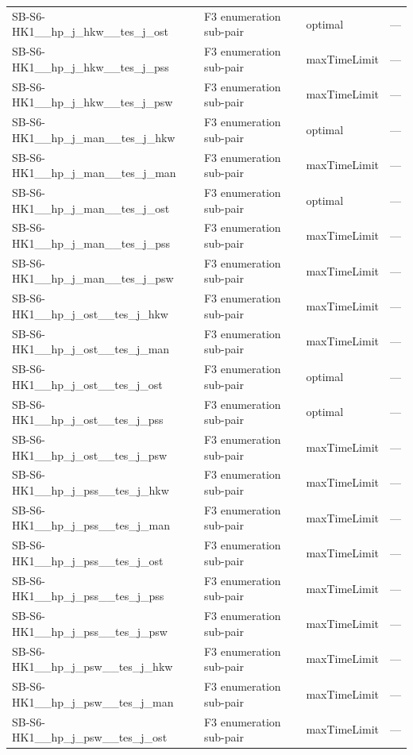 \begin{table}[htbp]
\begin{tabular}{lllr}
  SB-S6-HK1\_\_hp\_j\_hkw\_\_tes\_j\_ost & F3 enumeration sub-pair & optimal & — \\
  SB-S6-HK1\_\_hp\_j\_hkw\_\_tes\_j\_pss & F3 enumeration sub-pair & maxTimeLimit & — \\
  SB-S6-HK1\_\_hp\_j\_hkw\_\_tes\_j\_psw & F3 enumeration sub-pair & maxTimeLimit & — \\
  SB-S6-HK1\_\_hp\_j\_man\_\_tes\_j\_hkw & F3 enumeration sub-pair & optimal & — \\
  SB-S6-HK1\_\_hp\_j\_man\_\_tes\_j\_man & F3 enumeration sub-pair & maxTimeLimit & — \\
  SB-S6-HK1\_\_hp\_j\_man\_\_tes\_j\_ost & F3 enumeration sub-pair & optimal & — \\
  SB-S6-HK1\_\_hp\_j\_man\_\_tes\_j\_pss & F3 enumeration sub-pair & maxTimeLimit & — \\
  SB-S6-HK1\_\_hp\_j\_man\_\_tes\_j\_psw & F3 enumeration sub-pair & maxTimeLimit & — \\
  SB-S6-HK1\_\_hp\_j\_ost\_\_tes\_j\_hkw & F3 enumeration sub-pair & maxTimeLimit & — \\
  SB-S6-HK1\_\_hp\_j\_ost\_\_tes\_j\_man & F3 enumeration sub-pair & maxTimeLimit & — \\
  SB-S6-HK1\_\_hp\_j\_ost\_\_tes\_j\_ost & F3 enumeration sub-pair & optimal & — \\
  SB-S6-HK1\_\_hp\_j\_ost\_\_tes\_j\_pss & F3 enumeration sub-pair & optimal & — \\
  SB-S6-HK1\_\_hp\_j\_ost\_\_tes\_j\_psw & F3 enumeration sub-pair & maxTimeLimit & — \\
  SB-S6-HK1\_\_hp\_j\_pss\_\_tes\_j\_hkw & F3 enumeration sub-pair & maxTimeLimit & — \\
  SB-S6-HK1\_\_hp\_j\_pss\_\_tes\_j\_man & F3 enumeration sub-pair & maxTimeLimit & — \\
  SB-S6-HK1\_\_hp\_j\_pss\_\_tes\_j\_ost & F3 enumeration sub-pair & maxTimeLimit & — \\
  SB-S6-HK1\_\_hp\_j\_pss\_\_tes\_j\_pss & F3 enumeration sub-pair & maxTimeLimit & — \\
  SB-S6-HK1\_\_hp\_j\_pss\_\_tes\_j\_psw & F3 enumeration sub-pair & maxTimeLimit & — \\
  SB-S6-HK1\_\_hp\_j\_psw\_\_tes\_j\_hkw & F3 enumeration sub-pair & maxTimeLimit & — \\
  SB-S6-HK1\_\_hp\_j\_psw\_\_tes\_j\_man & F3 enumeration sub-pair & maxTimeLimit & — \\
  SB-S6-HK1\_\_hp\_j\_psw\_\_tes\_j\_ost & F3 enumeration sub-pair & maxTimeLimit & — \\

\end{tabular}
\end{table}
